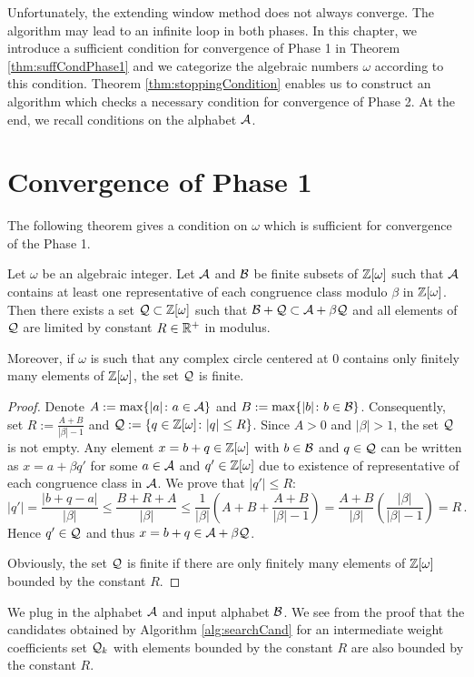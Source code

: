 Unfortunately, the extending window method does not always converge. The algorithm may lead to an infinite loop in both phases. 
In this chapter, we introduce a sufficient condition for convergence of Phase 1 in Theorem \ref{thm:suffCondPhase1} and we categorize the algebraic numbers $\omega$ according to this condition. Theorem \ref{thm:stoppingCondition} enables us to construct an algorithm which checks a necessary condition for convergence of Phase 2. At the end, we recall conditions on the alphabet $\mathcal{A}$. 

\section{Convergence of Phase 1}
\label{sec:convergencePhase1}
The following theorem gives a condition on $\omega$ which is sufficient for convergence of the Phase 1.
\begin{theo}
\label{thm:suffCondPhase1}
    Let $\omega$ be an algebraic integer. Let $\mathcal{A}$ and $\mathcal{B}$ be finite subsets of $\mathbb{Z}[\omega]$ such that $\mathcal{A}$ contains at least one representative of each congruence class modulo $\beta$ in $\mathbb{Z}[\omega]$. Then there exists a set $\mathcal{Q}\subset\mathbb{Z}[\omega]$ such that $ \mathcal{B} + \mathcal{Q} \subset \mathcal{A} + \beta \mathcal{Q}$ and all elements of $\mathcal{Q}$ are limited by constant $R\in \mathbb{R}^+$ in modulus.
    
    Moreover, if $\omega$ is such that any complex circle centered at 0 contains only finitely  many elements of $\mathbb{Z}[\omega]$, the set $\mathcal{Q}$ is finite. 
\end{theo}
\begin{proof}
 Denote $A:=\max\{|a|\colon a \in \mathcal{A}\}$ and $B:=\max\{|b|\colon b\in\mathcal{B}\}$. Consequently, set $R:=\frac{A+B}{|\beta|-1}$ and $\mathcal{Q}:=\{q\in\mathbb{Z}[\omega]\colon |q|\leq R\}$. Since $A>0$ and $|\beta|>1$, the set $\mathcal{Q}$ is not empty. Any element $x=b+q \in \mathbb{Z}[\omega]$ with $b\in\mathcal{B}$ and $q\in\mathcal{Q}$ can be written as $x=a+\beta q'$ for some $a\in\mathcal{A}$  and $q'\in\mathbb{Z}[\omega]$ due to existence of representative of each congruence class in $\mathcal{A}$. We prove that $|q'|\leq R$:
 $$
    |q'|=\frac{|b+q-a|}{|\beta|}\leq \frac{B+R+A}{|\beta|} \leq \frac{1}{|\beta|}\left(A+B+\frac{A+B}{|\beta|-1}\right)  =\frac{A+B}{|\beta|}\left(\frac{|\beta|}{|\beta|-1}\right)=R\,.
 $$ 
 Hence $q'\in\mathcal{Q}$ and thus  $x=b+q \in \mathcal{A} + \beta \mathcal{Q}$. 
 
 Obviously, the set $\mathcal{Q}$ is finite if there are only finitely many elements of $\mathbb{Z}[\omega]$ bounded by the constant $R$.
\end{proof}
We plug in the alphabet $\mathcal{A}$ and input alphabet $\mathcal{B}$. We see from the proof that the candidates obtained by Algorithm \ref{alg:searchCand} for an intermediate weight coefficients set $\mathcal{Q}_k$ with elements bounded by the constant $R$ are also bounded by the constant $R$. 

